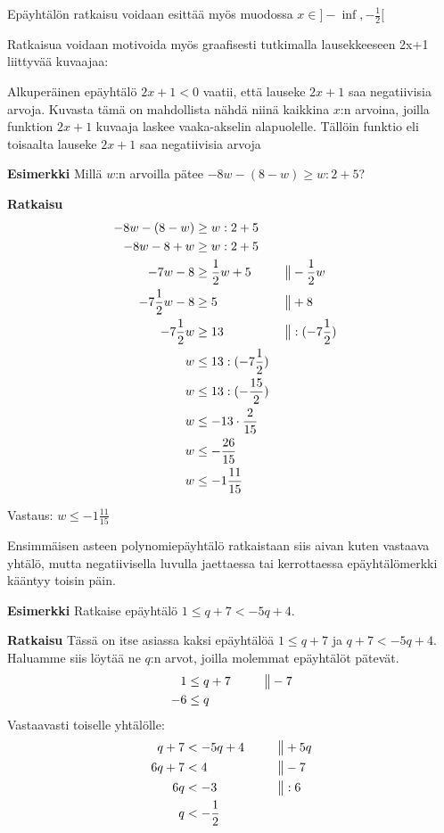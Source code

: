 Epäyhtälön ratkaisu voidaan esittää myös muodossa $x \in ]-\inf, -\frac{1}{2}[$

Ratkaisua voidaan motivoida myös graafisesti tutkimalla lausekkeeseen 2x+1 liittyvää kuvaajaa:


Alkuperäinen epäyhtälö $2x+1<0$ vaatii, että lauseke $2x+1$ saa negatiivisia arvoja. Kuvasta tämä on mahdollista nähdä niinä kaikkina $x$:n arvoina, joilla funktion $2x+1$ kuvaaja laskee vaaka-akselin alapuolelle. Tällöin funktio eli toisaalta lauseke $2x+1$ saa negatiivisia arvoja

\textbf{Esimerkki}
Millä $w$:n arvoilla pätee $-8w-(8-w)\geq w:2+5$?

\textbf{Ratkaisu}
\begin{align*}
-8w-(8-w)&\geq w:2+5 \\
-8w-8+w&\geq w:2+5 \\
-7w-8&\geq \frac12 w+5  \ \ \ \ \ &&\big\| -\frac12 w \\
-7\frac12 w-8&\geq 5  \ \ \ \ \ &&\big\| +8 \\
-7\frac12 w&\geq 13  \ \ \ \ \ &&\big\| :(-7\frac12) \\
w&\leq 13:(-7\frac12) \\
w&\leq 13:(-\frac{15}{2}) \\
w&\leq -13\cdot \frac{2}{15} \\
w&\leq -\frac{26}{15} \\
w&\leq -1\frac{11}{15}
\end{align*}

Vastaus: $w\leq -1\frac{11}{15}$

Ensimmäisen asteen polynomiepäyhtälö ratkaistaan siis aivan kuten vastaava yhtälö, mutta negatiivisella luvulla jaettaessa tai kerrottaessa epäyhtälömerkki kääntyy toisin päin.

\textbf{Esimerkki}
Ratkaise epäyhtälö $1\leq q+7<-5q+4$.

\textbf{Ratkaisu}
Tässä on itse asiassa kaksi epäyhtälöä $1\leq q+7$ ja $q+7<-5q+4$. Haluamme siis löytää ne $q$:n arvot, joilla molemmat epäyhtälöt pätevät.
\begin{align*}
1&\leq q+7 \ \ \ \ \ &&\big\| -7 \\
-6&\leq q
\end{align*}
Vastaavasti toiselle yhtälölle:
\begin{align*}
q+7&<-5q+4  \ \ \ \ \ &&\big\| +5q \\
6q+7&<4 &&\big\| -7 \\
6q&<-3 &&\big\| :6 \\
q&< -\frac12 \\
\end{align*}

